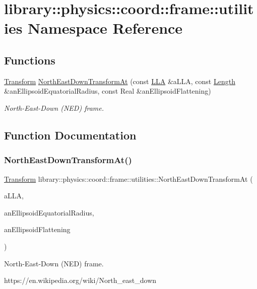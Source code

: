 \hypertarget{namespacelibrary_1_1physics_1_1coord_1_1frame_1_1utilities}{}\section{library\+:\+:physics\+:\+:coord\+:\+:frame\+:\+:utilities Namespace Reference}
\label{namespacelibrary_1_1physics_1_1coord_1_1frame_1_1utilities}
\subsection*{Functions}
\begin{DoxyCompactItemize}
\item 
\hyperlink{classlibrary_1_1physics_1_1coord_1_1_transform}{Transform} \hyperlink{namespacelibrary_1_1physics_1_1coord_1_1frame_1_1utilities_afe7e7a984acc093ccb0552c64b83fc92}{North\+East\+Down\+Transform\+At} (const \hyperlink{classlibrary_1_1physics_1_1coord_1_1spherical_1_1_l_l_a}{L\+LA} \&a\+L\+LA, const \hyperlink{classlibrary_1_1physics_1_1units_1_1_length}{Length} \&an\+Ellipsoid\+Equatorial\+Radius, const Real \&an\+Ellipsoid\+Flattening)
\begin{DoxyCompactList}\small\item\em North-\/\+East-\/\+Down (N\+ED) frame. \end{DoxyCompactList}\end{DoxyCompactItemize}


\subsection{Function Documentation}
\mbox{\label{namespacelibrary_1_1physics_1_1coord_1_1frame_1_1utilities_afe7e7a984acc093ccb0552c64b83fc92}} 
\subsubsection{\texorpdfstring{North\+East\+Down\+Transform\+At()}{NorthEastDownTransformAt()}}
{\footnotesize\ttfamily \hyperlink{classlibrary_1_1physics_1_1coord_1_1_transform}{Transform} library\+::physics\+::coord\+::frame\+::utilities\+::\+North\+East\+Down\+Transform\+At (\begin{DoxyParamCaption}\item[{const \hyperlink{classlibrary_1_1physics_1_1coord_1_1spherical_1_1_l_l_a}{L\+LA} \&}]{a\+L\+LA,  }\item[{const \hyperlink{classlibrary_1_1physics_1_1units_1_1_length}{Length} \&}]{an\+Ellipsoid\+Equatorial\+Radius,  }\item[{const Real \&}]{an\+Ellipsoid\+Flattening }\end{DoxyParamCaption})}



North-\/\+East-\/\+Down (N\+ED) frame. 

https\+://en.wikipedia.\+org/wiki/\+North\+\_\+east\+\_\+down 
